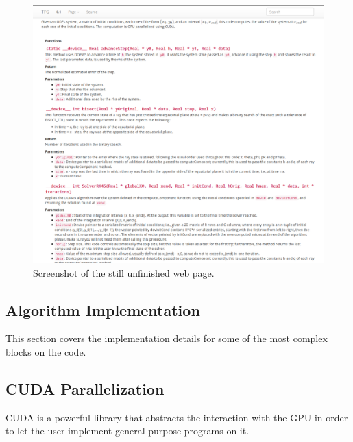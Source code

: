 \begin{figure}[bth]
	\myfloatalign
	\includegraphics[width=\linewidth]{gfx/documentationscreenshot}
	\caption[Screenshot of the still unfinished web page]{Screenshot of the still unfinished web page.}
	\label{fig:screenshot}
\end{figure}

\subsection{Algorithm Implementation}

This section covers the implementation details for some of the most complex blocks on the code.

\subsection{CUDA Parallelization}
\label{sec:cuda}

\ac{CUDA} is a powerful library that abstracts the interaction with the \ac{GPU} in order to let the user implement general purpose programs on it.

